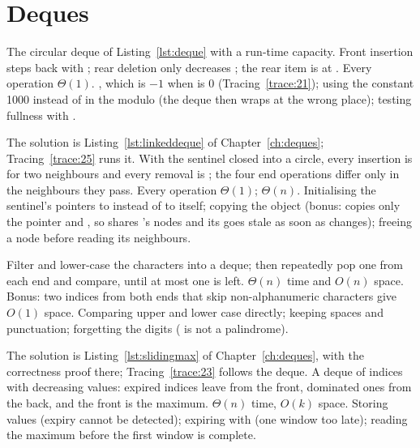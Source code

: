 \section{Deques}

\idea The circular deque of Listing~\ref{lst:deque} with a run-time capacity. Front
insertion steps  back with ; rear deletion only
decreases ; the rear item is at .
\complexity Every operation $\Theta(1)$.
\mistakes {}, which is $-1$ when  is 0
(Tracing~\ref{trace:21}); using the constant 1000 instead of  in the modulo
(the deque then wraps at the wrong place); testing fullness with .

The solution is Listing~\ref{lst:linkeddeque} of Chapter~\ref{ch:deques};
Tracing~\ref{trace:25} runs it.
\idea With the sentinel closed into a circle, every insertion is
 for two neighbours and every removal is ; the
four end operations differ only in the neighbours they pass.
\complexity Every operation $\Theta(1)$;  $\Theta(n)$.
\mistakes Initialising the sentinel's pointers to  instead of to itself; copying
the object (bonus:  copies only the  pointer and
, so  shares 's nodes and its  goes stale as soon as
 changes); freeing a
node before reading its neighbours.

\idea Filter and lower-case the characters into a deque; then repeatedly pop one from
each end and compare, until at most one is left.
\complexity $\Theta(n)$ time and $O(n)$ space. Bonus: two indices from both ends that
skip non-alphanumeric characters give $O(1)$ space.
\mistakes Comparing upper and lower case directly; keeping spaces and punctuation;
forgetting the digits ( is not a palindrome).

The solution is Listing~\ref{lst:slidingmax} of Chapter~\ref{ch:deques}, with the
correctness proof there; Tracing~\ref{trace:23} follows the deque.
\idea A deque of indices with decreasing values: expired indices leave from the front,
dominated ones from the back, and the front is the maximum.
\complexity $\Theta(n)$ time, $O(k)$ space.
\mistakes Storing values (expiry cannot be detected); expiring with 
(one window too late); reading the maximum before the first window is complete.

